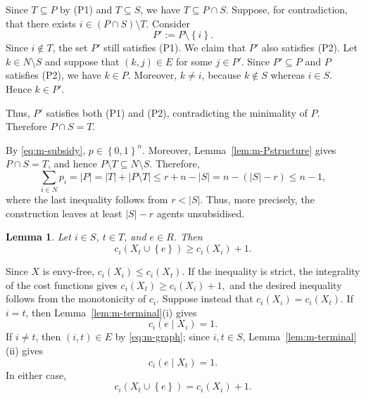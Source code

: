 \documentclass[11pt]{article}
\makeatletter
\theoremstyle{plain}
\newtheorem{lemma}{Lemma}
\theoremstyle{plain}
\renewenvironment{proof}[1][\proofname]{\par
  \pushQED{\qed}%
  \normalfont \topsep6\p@\@plus6\p@\relax
  \trivlist
  \item[\hskip\labelsep\bfseries #1\@addpunct{}]\ignorespaces
}{%
  \popQED\endtrivlist\@endpefalse
}
\newcommand{\agents}{N}                       %
\newcommand{\subsidy}{p}                      %
\newcommand{\cost}{c}
\newcommand{\set}[1]{\left\{#1\right\}}
\newcommand{\abs}[1]{\left\lvert#1\right\rvert}
\makeatother
\begin{document}
\begin{proof}
Since $T\subseteq P$ by \textnormal{(P1)} and $T\subseteq S$, we have $T\subseteq P\cap S$. Suppose, for contradiction, that there exists $i\in (P\cap S)\setminus T$. Consider
\[
    P':=P\setminus\set{i}.
\]
Since $i\notin T$, the set $P'$ still satisfies \textnormal{(P1)}. We claim that $P'$ also satisfies \textnormal{(P2)}. Let $k\in\agents\setminus S$ and suppose that $(k,j)\in E$ for some $j\in P'$. Since $P'\subseteq P$ and $P$ satisfies \textnormal{(P2)}, we have $k\in P$. Moreover, $k\neq i$, because $k\notin S$ whereas $i\in S$. Hence $k\in P'$.

Thus, $P'$ satisfies both \textnormal{(P1)} and \textnormal{(P2)}, contradicting the minimality of $P$. Therefore $P\cap S=T$.
\end{proof}








By \eqref{eq:m-subsidy}, $\subsidy\in\set{0,1}^n$. Moreover, Lemma~\ref{lem:m-Pstructure} gives $P\cap S=T$, and hence $P\setminus T\subseteq \agents\setminus S$. Therefore,
\begin{equation}
\label{eq_1}
\sum_{i\in N}p_i
 = |P|
 = |T|+|P\setminus T|
 \le r+n-|S|
 = n-(|S|-r)
 \le n-1,
\end{equation}
where the last inequality follows from $r<|S|$. Thus, more precisely, the construction leaves at least $|S|-r$ agents unsubsidised.





\begin{lemma}
\label{lem:m-expensive}
Let $i\in S$, $t\in T$, and $e\in R$. Then
\[
    \cost_i(X_t\cup\set e)\geq \cost_i(X_i)+1.
\]
\end{lemma}

\begin{proof}
Since $X$ is envy-free, \( \cost_i(X_i)\leq \cost_i(X_t). \) If the inequality is strict, the integrality of the cost functions gives \( \cost_i(X_t)\geq \cost_i(X_i)+1, \) and the desired inequality follows from the monotonicity of $\cost_i$. Suppose instead that \(   \cost_i(X_i)=\cost_i(X_t). \) If $i=t$, then Lemma~\ref{lem:m-terminal}(i) gives
\[
    \cost_i(e\mid X_i)=1.
\]
If $i\neq t$, then $(i,t)\in E$ by \eqref{eq:m-graph}; since $i,t\in S$, Lemma~\ref{lem:m-terminal}(ii) gives
\[
    \cost_i(e\mid X_t)=1.
\] In either case,
\[
    \cost_i(X_t\cup\set e)=\cost_i(X_i)+1.
\]
\end{proof}
\end{document}
